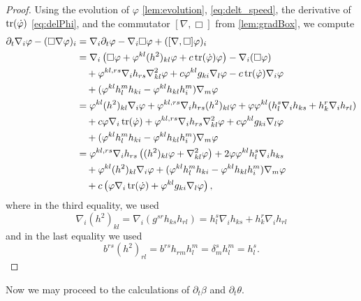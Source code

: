 \documentclass{amsart}
\begin{document}
\begin{proof}
Using the evolution of \(\varphi\) \cref{lem:evolution}, \cref{eq:delt_speed}, the derivative of \(\operatorname{tr}(\dot{\varphi})\) \cref{eq:delPhi}, and the commutator \([\nabla, \Box]\) from \cref{lem:gradBox}, we compute
\[
\begin{split}
\partial_{t}\nabla_i \varphi - (\Box\nabla \varphi)_{i} &= \nabla_i \partial_t \varphi - \nabla_i \Box \varphi + ([\nabla, \Box] \varphi)_i \\
&= \nabla_i \left(\Box\varphi + \varphi^{kl}(h^2)_{kl}\varphi + c \operatorname{tr}(\dot{\varphi})\varphi\right) - \nabla_i (\Box\varphi) \\
&\quad + \varphi^{kl,rs} \nabla_i h_{rs} \nabla^2_{kl} \varphi + c\varphi^{kl}g_{ki} \nabla_l \varphi - c\operatorname{tr}(\dot{\varphi})\nabla_i \varphi \\
&\quad + (\varphi^{kl}h^{m}_{l}h_{ki} - \varphi^{kl}h_{kl}h^{m}_{i}) \nabla_m \varphi \\
&= \varphi^{kl}(h^2)_{kl}\nabla_i \varphi + \varphi^{kl,rs}\nabla_i h_{rs} (h^2)_{kl}\varphi + \varphi\varphi^{kl}(h^s_l \nabla_i h_{ks} + h^r_k \nabla_i h_{rl})\\&\quad  + c \varphi\nabla_i\operatorname{tr}(\dot{\varphi})
+ \varphi^{kl,rs} \nabla_i h_{rs} \nabla^2_{kl} \varphi + c\varphi^{kl}g_{ki}\nabla_l \varphi \\
&\quad + (\varphi^{kl}h^{m}_{l}h_{ki} - \varphi^{kl}h_{kl}h^{m}_{i}) \nabla_m \varphi \\
&= \varphi^{kl,rs}\nabla_i h_{rs} \left((h^2)_{kl}\varphi + \nabla^2_{kl} \varphi\right) + 2 \varphi\varphi^{kl} h^s_l \nabla_i h_{ks} \\
&\quad + \varphi^{kl}(h^2)_{kl}\nabla_i \varphi + (\varphi^{kl}h^{m}_{l}h_{ki} - \varphi^{kl}h_{kl}h^{m}_{i}) \nabla_m \varphi \\
&\quad + c \left(\varphi\nabla_i\operatorname{tr}(\dot{\varphi}) + \varphi^{kl}g_{ki}\nabla_l \varphi\right),
\end{split}
\]
where in the third equality, we used
\[
\nabla_i (h^2)_{kl} = \nabla_i (g^{sr} h_{ks} h_{rl}) = h^s_l \nabla_i h_{ks} + h^r_k \nabla_i h_{rl}
\]
and in the last equality we used
\[
b^{rs} (h^2)_{rl} = b^{rs} h_{rm} h^m_l = \delta^s_m h^m_l = h^s_l.
\]
\end{proof}
Now we may proceed to the calculations of \(\partial_t \beta\) and \(\partial_t \theta\).
\end{document}
